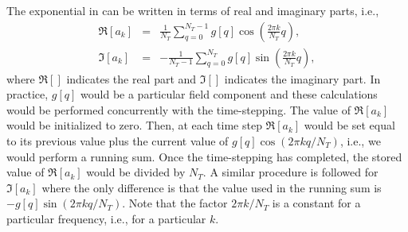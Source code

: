 The exponential in  can be written in terms of real
and imaginary parts, i.e., 
\begin{eqnarray}
  \Re[a_k] &=& \frac{1}{N_T} 
           \sum_{q=0}^{N_T - 1} g[q] \cos\!\left(\frac{2\pi k}{N_T}q\right), \\
  \Im[a_k] &=& -\frac{1}{N_T - 1}
           \sum_{q=0}^{N_T} g[q] \sin\!\left(\frac{2\pi k}{N_T}q\right),
\end{eqnarray}
where $\Re[]$ indicates the real part and $\Im[]$ indicates the
imaginary part.  In practice, $g[q]$ would be a particular field
component and these calculations would be performed concurrently with
the time-stepping.  The value of $\Re[a_k]$ would be initialized to
zero.  Then, at each time step $\Re[a_k]$ would be set equal to its
previous value plus the current value of $g[q] \cos(2\pi k q/N_T)$,
i.e., we would perform a running sum.  Once the time-stepping
has completed, the stored value of $\Re[a_k]$ would be divided by $N_T$.
A similar procedure is followed for $\Im[a_k]$ where the only
difference is that the value used in the running sum is $-g[q]
\sin(2\pi k q/N_T)$.  Note that the factor $2\pi k/N_T$ is a constant
for a particular frequency, i.e., for a particular $k$.

